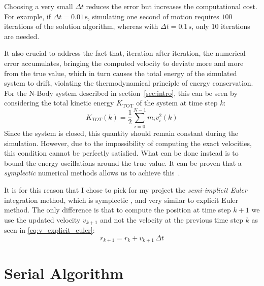\documentclass{article}
\begin{document}
Choosing a very small $\Delta t$ reduces the error but increases the computational cost.
For example, if $\Delta t = 0.01\,\text{s}$, simulating one second of motion requires $100$ iterations of the solution algorithm, whereas with $\Delta t = 0.1\,\text{s}$, only $10$ iterations are needed.

It also crucial to address the fact that, iteration after iteration, the numerical error accumulates, bringing the computed velocity to deviate more and more from the true value, which in turn causes the total energy of the simulated system to drift, violating the thermodynamical principle of energy conservation.
For the N-Body system described in section~\ref{sec:intro}, this can be seen by considering the total kinetic energy $K_{\text{TOT}}$ of the system at time step $k$:
\begin{equation}
K_{TOT}(k) = \frac{1}{2} \sum_{i=0}^{N-1}m_iv_i^2(k)
\end{equation}
Since the system is closed, this quantity should remain constant during the simulation. However, due to the impossibility of computing the exact velocities, this condition cannot be perfectly satisfied.
What can be done instead is to bound the energy oscillations around the true value.
It can be proven that a \emph{symplectic} numerical methods allows us to achieve this~\cite{ENGLE2005432}.

It is for this reason that I chose to pick for my project the \emph{semi-implicit Euler} integration method, which is symplectic \cite{cioaca2013impactexplicitsemiimplicitintegration}, and very similar to explicit Euler method. The only difference is that to compute the position at time step $k+1$ we use the updated velocity $v_{k+1}$ and not the velocity at the previous time step $k$ as seen in \ref{eq:v_explicit_euler}:
\begin{equation}
r_{k+1}=r_k+v_{k+1} \, \Delta t
\label{eq:v_semi_implicit}
\end{equation}

\section{Serial Algorithm}

 
\end{document}
